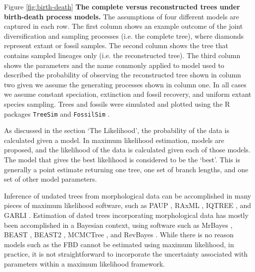 \documentclass[11pt]{article}
\makeatletter
\newenvironment{boxedtext}[1]{%
  \begin{mdframed}[frametitle=#1,
    frametitlefont=\scshape\mdseries\sffamily,
    frametitlealignment=\centering,
    backgroundcolor=black!20,
    hidealllines=true,
    innerleftmargin=11\p@,innerrightmargin=11\p@,
    frametitleaboveskip=0.5\baselineskip,
    innerbottommargin=0.5\baselineskip,
    skipabove=\baselineskip,skipbelow=0.5\baselineskip]
}{%
  \end{mdframed}%
}
\makeatother
\begin{document}
\clearpage


Figure \ref{fig:birth-death} \textbf{The complete versus reconstructed trees under birth-death process models.}
The assumptions of four different models are captured in each row.
The first column shows an example outcome of the joint diversification and sampling processes (i.e. the complete tree), where diamonds represent  extant or fossil samples.
The second column shows the tree that contains sampled lineages only (i.e. the reconstructed tree). 
The third column shows the parameters and the name commonly applied to model used to described the probability of observing the reconstructed tree shown in column two given we assume the generating processes shown in column one.
In all cases we assume constant speciation, extinction and fossil recovery, and uniform extant species sampling.
Trees and fossils were simulated and plotted using the R packages \texttt{TreeSim} \cite{Stadler2011} and \texttt{FossilSim} \cite{BaridoSottani2019b}.

\clearpage

\begin{boxedtext}{Maximum Likelihood and Bayesian Estimation}


As discussed in the section `The Likelihood', the probability of the data is calculated given a model. 
In maximum likelihood estimation, models are proposed, and the likelihood of the data is calculated given each of those models.
The model that gives the best likelihood is considered to be the `best'.
This is generally a point estimate returning one tree, one set of branch lengths, and one set of other model parameters.

Inference of undated trees from morphological data can be accomplished in many pieces of maximum likelihood software, such as PAUP \citep{Swofford2003}, RAxML \citep{Stamatakis2014}, IQTREE \citep{IQtree}, and GARLI \cite{zwickl2006}.
Estimation of dated trees incorporating morphological data has mostly been accomplished in a Bayesian context, using software such as MrBayes \cite{Huelsenbeck2002, Ronquist2003}, BEAST \citep{BEAST}, BEAST2 \citep{BEAST2} , MCMCTree \citep{MCMCtree}, and RevBayes \citep{Hoehna2014b, Hoehna2016b}.
While there is no reason models such as the FBD cannot be estimated using maximum likelihood, in practice, it is not straightforward to incorporate the uncertainty associated with parameters within a maximum likelihood framework.
\end{boxedtext}



\end{document}
